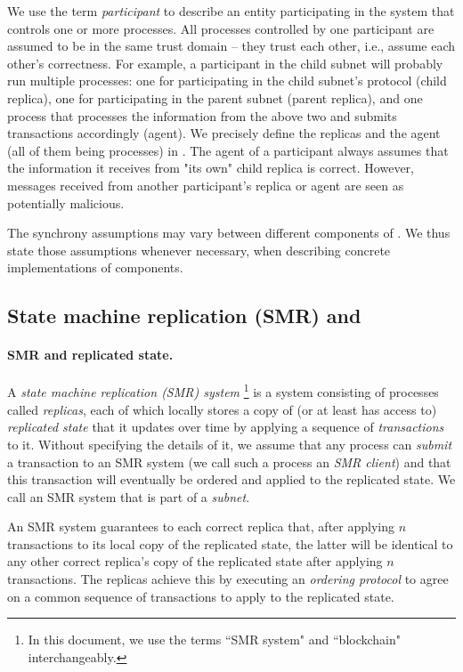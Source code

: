 We use the term \emph{participant} to describe an entity participating in the system that controls one or more processes.
All processes controlled by one participant are assumed to be in the same trust domain -- they trust each other, i.e., assume each other's correctness.
For example, a participant in the child subnet will probably run multiple processes:
one for participating in the child subnet's protocol (child replica),
one for participating in the parent subnet (parent replica),
and one process that processes the information from the above two and submits transactions accordingly (\ipc agent).
We precisely define the replicas and the \ipc agent (all of them being processes) in .
The \ipc agent of a participant always assumes that the information it receives from "its own" child replica is correct.
However, messages received from another participant's replica or \ipc agent are seen as potentially malicious.

The synchrony assumptions may vary between different components of \ipc.
We thus state those assumptions whenever necessary, when describing concrete implementations of \ipc components.

\subsection{State machine replication (SMR) and \dapps}
\label{sec:smr}

\paragraph{SMR and replicated state.}
A \emph{state machine replication (SMR) system}%
\footnote{In this document, we use the terms ``SMR system" and ``blockchain" interchangeably.}
is a system consisting of processes called \emph{replicas}, each of which locally stores a copy of (or at least has access to) \emph{replicated state}
that it updates over time by applying a sequence of \emph{transactions} to it.
Without specifying the details of it, we assume that any process can \emph{submit} a transaction to an SMR system (we call such a process an \emph{SMR client})
and that this transaction will eventually be ordered and applied to the replicated state.
We call an SMR system that is part of \ipc a \emph{subnet}.

An SMR system guarantees to each correct replica that, after applying $n$ transactions to its local copy of the replicated state,
the latter will be identical to any other correct replica’s copy of the replicated state after applying $n$ transactions.
The replicas achieve this by executing an \emph{ordering protocol} to agree on a common sequence of transactions to apply to the replicated state.

